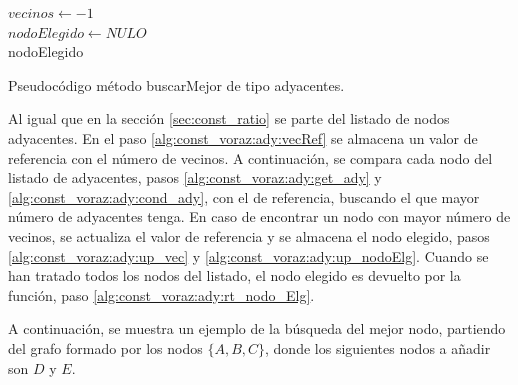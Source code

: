 \begin{algorithm}
	$ vecinos \gets -1 $ \label{alg:const_voraz:ady:vecRef} \\[0.2cm]
	$ nodoElegido \gets NULO $ \label{alg:const_voraz:ady:nodoElg}  \\[0.2cm]
	\Return nodoElegido \label{alg:const_voraz:ady:rt_nodo_Elg} 
	\caption{Pseudocódigo método buscarMejor de tipo adyacentes.}
	\label{alg:const_voraz:ady}
\end{algorithm}

Al igual que en la sección \ref{sec:const_ratio} se parte del listado de nodos adyacentes. En el paso \ref{alg:const_voraz:ady:vecRef} se almacena un valor de referencia con el número de vecinos. A continuación, se compara cada nodo del listado de adyacentes, pasos \ref{alg:const_voraz:ady:get_ady} y \ref{alg:const_voraz:ady:cond_ady}, con el de referencia, buscando el que mayor número de adyacentes tenga. En caso de encontrar un nodo con mayor número de vecinos, se actualiza el valor de referencia y se almacena el nodo elegido, pasos \ref{alg:const_voraz:ady:up_vec} y \ref{alg:const_voraz:ady:up_nodoElg}. Cuando se han tratado todos los nodos del listado, el nodo elegido es devuelto por la función, paso \ref{alg:const_voraz:ady:rt_nodo_Elg}.

A continuación, se muestra un ejemplo de la búsqueda del mejor nodo, partiendo del grafo formado por los nodos $\{A, B, C\}$, donde los siguientes nodos a añadir son $D$ y $E$.

